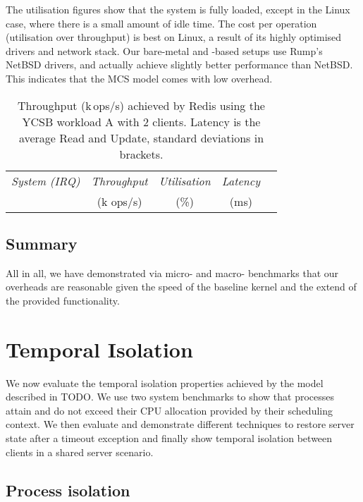 The utilisation figures show that the system is fully loaded, except
in the Linux case, where there is a small amount of idle time. The
cost per operation (utilisation over throughput) is best on Linux, a
result of its highly optimised drivers and network stack. Our
bare-metal and \selfour-based setups use Rump's NetBSD drivers, and
actually achieve slightly better performance than NetBSD. This
indicates that the MCS model comes with low overhead.

\begin{table}[t]\centering
      \begin{tabular}{lcccc}\toprule
        \emph{System (IRQ)}  & \emph{Throughput} & \emph{Utilisation} &  \emph{Latency} \\
                               & (k ops/s)     &  (\%)            &   (ms)            \\
        \midrule
      
      \bottomrule
    \end{tabular}
    \caption{Throughput (k\,ops/s) achieved by Redis using the YCSB
      workload A with 2 clients.  Latency is the average Read and Update,
      standard deviations in brackets.}
    \label{t:redis}
\end{table}

\subsection{Summary}

All in all, we have demonstrated via micro- and macro- benchmarks that our overheads are
reasonable given the speed of the baseline kernel and the extend of the provided
functionality. 
\clearpage

\section{Temporal Isolation}

We now evaluate the temporal isolation properties achieved by the model described in TODO. We use
two system benchmarks to show that processes attain and do not exceed their
CPU allocation provided by their scheduling context. We then evaluate and demonstrate different
techniques to restore server state after a timeout exception and finally show temporal isolation between
clients in a shared server scenario.

\subsection{Process isolation} 

